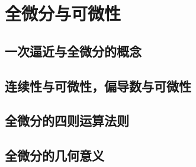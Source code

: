 \section{全微分与可微性}
\subsection{一次逼近与全微分的概念}
\subsection{连续性与可微性，偏导数与可微性}
\subsection{全微分的四则运算法则}
\subsection{全微分的几何意义}
